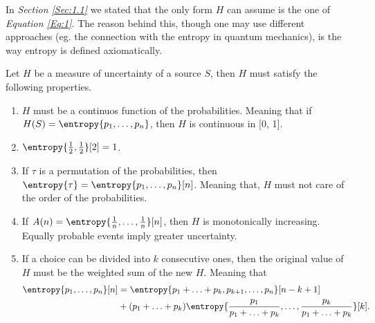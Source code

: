 \documentclass{subfiles}
\begin{document}
    In \emph{Section \ref{Sec:1.1}} we stated that the only form \(H\) can 
    assume is the one of \emph{Equation \eqref{Eq:1}}. 
    The reason behind this, though one may use different approaches 
        (eg. the connection with the entropy in quantum mechanics), 
        is the way entropy is defined axiomatically. 

    \begin{axiom*}
        Let \(H\) be a measure of uncertainty of a source \(S\), 
            then \(H\) must satisfy the following properties.
        \begin{enumerate}
            \item \(H\) must be a continuos function of the probabilities.
                Meaning that if \(H(S) = \entropy{p_{1}, \ldots, p_{n}}\), 
                then \(H\) is continuous in [0, 1].

            \item \(\entropy{\tfrac{1}{2}, \tfrac{1}{2}}[2] = 1\).

            \item If \(\tau\) is a permutation of the probabilities, 
                then \(\entropy{\tau} = \entropy{p_{1}, \ldots, p_{n}}[n]\). 
                Meaning that, \(H\) must not care of the order of the probabilities.

            \item If \(A(n) = \entropy{\tfrac{1}{n}, \ldots, \tfrac{1}{n}}[n]\),
                then \(H\) is monotonically increasing.
                Equally probable events imply greater uncertainty.

            \item If a choice can be divided into \(k\) consecutive ones,
                then the original value of \(H\) must be the weighted sum of the new \(H\).
                Meaning that
                \[\begin{aligned}
                    \entropy{p_{1}, \ldots, p_{n}}[n] & = 
                        \entropy{
                            p_{1} + \ldots + p_{k}, p_{k + 1}, \ldots, p_{n}
                        }[n - k + 1] \\ 
                        & + (p_{1} + \ldots + p_{k})
                            \entropy{
                                \frac{p_{1}}{p_{1} + \ldots + p_{k}},
                                \ldots,
                                \frac{p_{k}}{p_{1} + \ldots + p_{k}}
                            }[k].
                \end{aligned}\]
       \end{enumerate}
    \end{axiom*} 
\end{document}
